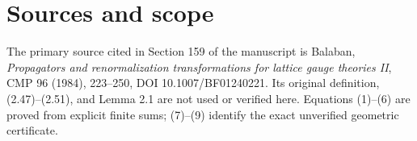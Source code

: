 \documentclass{article}
\begin{document}
\section{Sources and scope}
The primary source cited in Section 159 of the manuscript is Balaban, \emph{Propagators and renormalization transformations for lattice gauge theories II}, CMP 96 (1984), 223--250, DOI 10.1007/BF01240221. Its original definition, (2.47)--(2.51), and Lemma 2.1 are not used or verified here. Equations (1)--(6) are proved from explicit finite sums; (7)--(9) identify the exact unverified geometric certificate.
\end{document}
